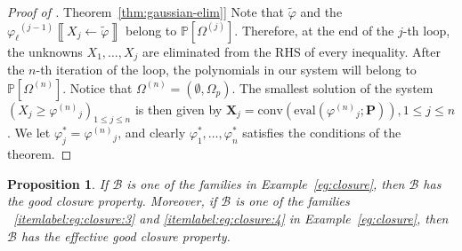 \documentclass[10pt]{amsart}
\theoremstyle{plain}
\newtheorem{proposition}[lemma]{Proposition}
\theoremstyle{definition}
\providecommand{\namedref}[2]{\hyperref[#2]{#1~\ref*{#2}}\xspace}
\providecommand{\theoremref}[1]{\namedref{Theorem}{thm:#1}}
\providecommand{\bP}[0]{\ensuremath{\mathbf P}\xspace}
\providecommand{\bX}[0]{\ensuremath{\mathbf X}\xspace}
\let\leq\leqslant
\let\geq\geqslant
\providecommand{\p}[1]{\ensuremath{^{\left(#1\right)}}\xspace}
\providecommand{\conv}[1]{\ensuremath{\mathrm{conv}{\left({#1}\right)}\xspace}}
\providecommand{\evalmap}[0]{\ensuremath{\mathrm{eval}}\xspace}
\begin{document}
\begin{proof}[Proof of \theoremref{gaussian-elim}]
Note that $\widetilde\varphi$ and the $\varphi_\ell\p{j-1}  \left\llbracket X_j\gets \widetilde\varphi \right\rrbracket$ 
belong to $\mathbb{P}[\Omega^{(j)}]$.
Therefore, at the end of the $j$-th loop, the unknowns $X_1, \dotsc, X_j$ are eliminated from the RHS of every inequality. 
After the $n$-th iteration of the loop, the polynomials in our system will
belong to $\mathbb{P}[\Omega^{(n)}]$. Notice that
$\Omega^{(n)} = (\emptyset,\Omega_p)$.
The smallest solution of the system $(X_j \geq \varphi\p{n}_j)_{1 \leq j \leq n}$ is then given by
$\bX_j = \conv{\evalmap(\varphi\p{n}_j;\bP)}, 1 \leq j \leq n$.
We let $\varphi_j^* = \varphi\p{n}_j$, and clearly 
$\varphi^*_1,\ldots,\varphi_n^*$ satisfies the conditions of the theorem.
\end{proof}


\begin{proposition}
\label{prop:closure-under-ops}
If $\mathcal{B}$ is one of the families in Example~\ref{eg:closure}, then $\mathcal{B}$ has the good closure property. Moreover, if $\mathcal{B}$ is one of the families 
~\eqref{itemlabel:eg:closure:3} and \eqref{itemlabel:eg:closure:4} in Example~\ref{eg:closure},  then $\mathcal{B}$ has the effective good closure property. 
\end{proposition}
\end{document}
